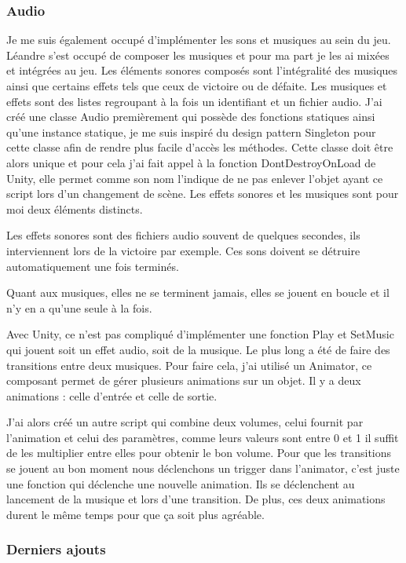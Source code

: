 \documentclass{article}
\begin{document}
\subsubsection{Audio}


Je me suis également occupé d'implémenter les sons et musiques au sein du jeu. Léandre s'est occupé de composer les musiques et pour ma part je les ai mixées et intégrées au jeu. Les éléments sonores composés sont l'intégralité des musiques ainsi que certains effets tels que ceux de victoire ou de défaite.
Les musiques et effets sont des listes regroupant à la fois un identifiant et un fichier audio. J'ai créé une classe Audio premièrement qui possède des fonctions statiques ainsi qu'une instance statique, je me suis inspiré du design pattern Singleton pour cette classe afin de rendre plus facile d'accès les méthodes. Cette classe doit être alors unique et pour cela j'ai fait appel à la fonction DontDestroyOnLoad de Unity, elle permet comme son nom l'indique de ne pas enlever l'objet ayant ce script lors d'un changement de scène. Les effets sonores et les musiques sont pour moi deux éléments distincts.

Les effets sonores sont des fichiers audio souvent de quelques secondes, ils interviennent lors de la victoire par exemple. Ces sons doivent se détruire automatiquement une fois terminés.

Quant aux musiques, elles ne se terminent jamais, elles se jouent en boucle et il n'y en a qu'une seule à la fois.

Avec Unity, ce n'est pas compliqué d'implémenter une fonction Play et SetMusic qui jouent soit un effet audio, soit de la musique. Le plus long a été de faire des transitions entre deux musiques.
Pour faire cela, j'ai utilisé un Animator, ce composant permet de gérer plusieurs animations sur un objet. Il y a deux animations : celle d'entrée et celle de sortie.

J'ai alors créé un autre script qui combine deux volumes, celui fournit par l'animation et celui des paramètres, comme leurs valeurs sont entre 0 et 1 il suffit de les multiplier entre elles pour obtenir le bon volume. Pour que les transitions se jouent au bon moment nous déclenchons un trigger dans l'animator, c'est juste une fonction qui déclenche une nouvelle animation. Ils se déclenchent au lancement de la musique et lors d'une transition. De plus, ces deux animations durent le même temps pour que ça soit plus agréable.




\newpage
\subsubsection{Derniers ajouts}
\end{document}
